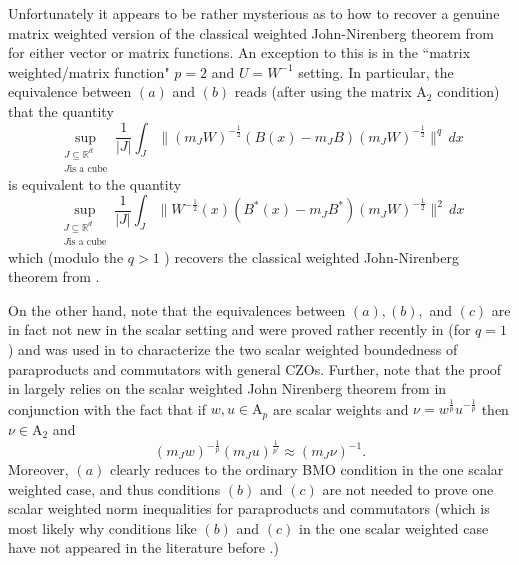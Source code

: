\documentclass[12pt,reqno ]{amsart}
\numberwithin{equation}{section}
\theoremstyle{definition}
\newcommand{\Rd}{\ensuremath{\mathbb{R}^d}}
\begin{document}
Unfortunately it appears to be rather mysterious as to how to recover a genuine matrix weighted version of the classical weighted John-Nirenberg theorem from \cite{MW} for either vector or matrix functions.  An exception to this is in the ``matrix weighted/matrix function" $p = 2$ and $U = W^{-1}$ setting.  In particular, the equivalence between $(a)$ and $(b)$ reads (after using the matrix A${}_2$ condition) that the quantity\begin{equation} \label{MatrixBMO1} \sup_{\substack{J \subseteq \Rd \\ J \text{is a cube}} } \frac{1}{|J|} \int_J \|(m_J W)^{-\frac12}  (B(x) - m_J B) (m_J W)^{-\frac12} \|^{q} \, dx   \end{equation} is equivalent to the quantity \begin{equation} \label{MatrixBMO2} \sup_{\substack{J \subseteq \Rd \\ J \text{is a cube}} }   \frac{1}{|J|} \int_J \|W^{-\frac{1}{2}} (x) (B^* (x) - m_J B^*) (m_J W)^{-\frac12}  \|^{2} \, dx   \end{equation} which (modulo the $q > 1$ ) recovers the classical weighted John-Nirenberg theorem from \cite{MW}.

 On the other hand, note that the equivalences between $(a), (b),$ and $(c)$ are in fact not new in the scalar setting and were proved rather recently in \cite{HLW} (for $q = 1$) and was used in \cite{HLW} to characterize the two scalar weighted boundedness of paraproducts and commutators with general CZOs.  Further, note that the proof in \cite{HLW} largely relies on the scalar weighted John Nirenberg theorem from \cite{MW} in conjunction with the fact that if $w, u \in \text{A}_p$ are scalar weights and $\nu = w^\frac{1}{p} u^{-\frac{1}{p}}$ then $\nu \in \text{A}_2$ and \begin{equation*} (m_J w )^{-\frac{1}{p}} (m_J  u )^{\frac{1}{p' }} \approx (m_J  \nu)^{-1}. \end{equation*} Moreover,  $(a)$ clearly reduces to the ordinary BMO condition in the one scalar weighted case, and thus conditions $(b)$ and $(c)$ are not needed to prove one scalar weighted norm inequalities for paraproducts and commutators (which is most likely why conditions like $(b)$ and $(c)$ in the one scalar weighted case have not appeared in the literature before \cite{HLW}.)
\end{document}
